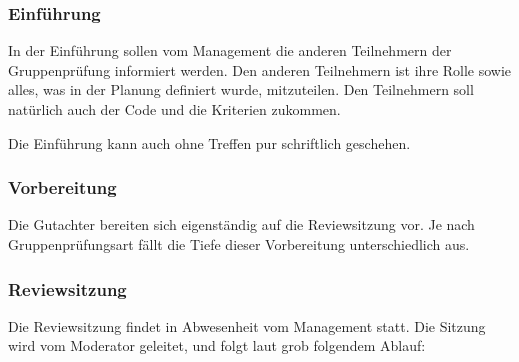 \documentclass[	%
		fontsize=11pt,  %
		a4paper,	    %
		ngerman,		%
		sans,			%
		f4,				%
	]{HsH-report}		%
\begin{document}
\subsubsection{Einführung}

In der Einführung sollen vom Management die anderen Teilnehmern der
Gruppenprüfung informiert werden. Den anderen Teilnehmern ist ihre Rolle sowie
alles, was in der Planung definiert wurde, mitzuteilen. Den Teilnehmern soll
natürlich auch der Code und die Kriterien zukommen.

Die Einführung kann auch ohne Treffen pur schriftlich geschehen.

\subsubsection{Vorbereitung}

Die Gutachter bereiten sich eigenständig auf die Reviewsitzung vor. Je nach
Gruppenprüfungsart fällt die Tiefe dieser Vorbereitung unterschiedlich aus.

\subsubsection{Reviewsitzung} \label{reviewsitzung}

Die Reviewsitzung findet in Abwesenheit vom Management statt. Die Sitzung wird
vom Moderator geleitet, und folgt laut \textcite{fruehauf:pruefung} grob
folgendem Ablauf:
\end{document}
